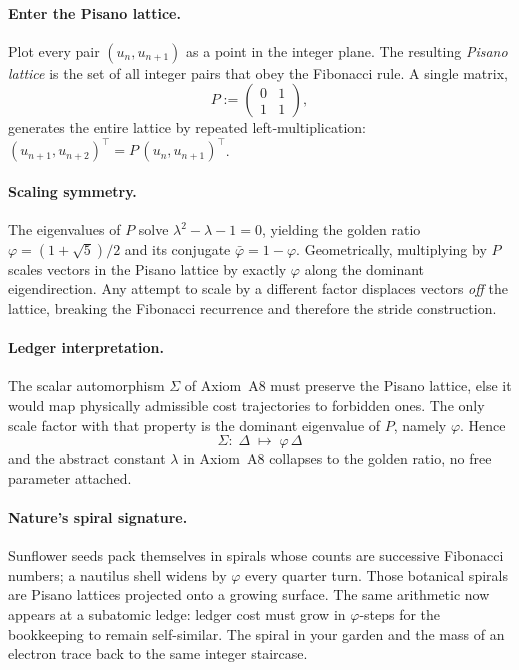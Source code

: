 \documentclass[11pt]{article}
\begin{document}
\paragraph{Enter the Pisano lattice.}
Plot every pair \((u_{n},u_{n+1})\) as a point in the integer plane.
The resulting \emph{Pisano lattice} is the set of all integer pairs that
obey the Fibonacci rule.  A single matrix,
\[
P := \begin{pmatrix}
0 & 1\\
1 & 1
\end{pmatrix},
\]
generates the entire lattice by repeated left‐multiplication:
\((u_{n+1},u_{n+2})^{\!\top} = P\,(u_{n},u_{n+1})^{\!\top}\).

\paragraph{Scaling symmetry.}
The eigenvalues of \(P\) solve
\(\lambda^{2}-\lambda-1=0\),
yielding the golden ratio \(\varphi=(1+\sqrt{5})/2\)
and its conjugate \(\bar{\varphi}=1-\varphi\).
Geometrically, multiplying by \(P\) scales vectors in the Pisano lattice by exactly \(\varphi\) along the dominant eigendirection.
Any attempt to scale by a different factor displaces vectors \emph{off} the lattice, breaking the Fibonacci recurrence and therefore the stride construction.

\paragraph{Ledger interpretation.}
The scalar automorphism \(\Sigma\) of Axiom~A8 must preserve the Pisano lattice, else it would map physically admissible cost trajectories to forbidden ones.  The only scale factor with that property is the dominant eigenvalue of \(P\), namely \(\varphi\).  Hence
\[
\boxed{\;
\Sigma:\;\Delta \;\longmapsto\; \varphi\,\Delta
\;}
\]
and the abstract constant \(\lambda\) in Axiom~A8 collapses to the golden ratio, no free parameter attached.

\paragraph{Nature’s spiral signature.}
Sunflower seeds pack themselves in spirals whose counts are successive
Fibonacci numbers; a nautilus shell widens by \(\varphi\) every quarter turn.
Those botanical spirals are Pisano lattices projected onto a growing surface.
The same arithmetic now appears at a subatomic ledge: ledger cost must grow in
\(\varphi\)-steps for the bookkeeping to remain self-similar.  The spiral in your
garden and the mass of an electron trace back to the same integer staircase.
\end{document}
